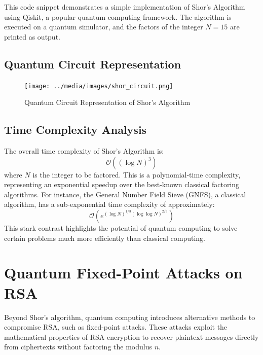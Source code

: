 \documentclass{article}
\begin{document}
This code snippet demonstrates a simple implementation of Shor's Algorithm using Qiskit, a popular quantum computing framework. The algorithm is executed on a quantum simulator, and the factors of the integer \( N = 15 \) are printed as output.

\subsection{Quantum Circuit Representation}

\begin{figure}[!h]
    \centering
    \texttt{[image: ../media/images/shor\_circuit.png]}
    \caption{Quantum Circuit Representation of Shor's Algorithm}
    \label{fig:shor_circuit}
\end{figure}




\subsection{Time Complexity Analysis}

\begin{notebox}[title=Performance Comparison]
    The overall time complexity of Shor's Algorithm is:
    \[
        \mathcal{O}((\log N)^3)
    \]
    where $N$ is the integer to be factored. This is a polynomial-time complexity, representing an exponential speedup over the best-known classical factoring algorithms. For instance, the General Number Field Sieve (GNFS), a classical algorithm, has a sub-exponential time complexity of approximately:
    \[
        \mathcal{O}\left(e^{(\log N)^{1/3} (\log \log N)^{2/3}}\right)
    \]
    This stark contrast highlights the potential of quantum computing to solve certain problems much more efficiently than classical computing.
\end{notebox}

\section{Quantum Fixed-Point Attacks on RSA}

\begin{warningbox}[title=Alternative Threat Vector]
    Beyond Shor's algorithm, quantum computing introduces alternative methods to compromise RSA, such as fixed-point attacks. These attacks exploit the mathematical properties of RSA encryption to recover plaintext messages directly from ciphertexts without factoring the modulus \( n \).
\end{warningbox}
\end{document}
